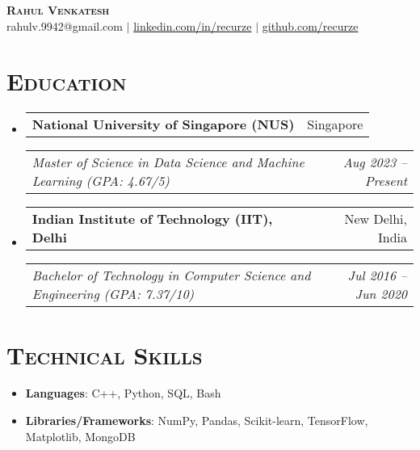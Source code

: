\documentclass[11pt]{article}
\makeatletter
\newcommand{\headerrow}[2]
{\begin{tabular*}{\linewidth}{l@{\extracolsep{\fill}}r}
    #1 &
    #2 \\
\end{tabular*}}
\makeatother
\begin{document}
\thispagestyle{empty}

\begin{center}
    {\huge \textsc{\textbf{Rahul Venkatesh}}} \\[2pt]
    rahulv.9942@gmail.com
    $\mid$
    \href{https://www.linkedin.com/in/recurze}{linkedin.com/in/recurze}
    $\mid$
    \href{https://github.com/recurze}{github.com/recurze}
\end{center}

\section*{\textsc{\textbf{Education}}}
\begin{itemize}[leftmargin=0em]

\item[]
    \headerrow {\textbf{National University of Singapore (NUS)}}{Singapore}
        \headerrow {\emph{Master of Science in Data Science and Machine Learning (GPA: 4.67/5)}}{\emph{Aug 2023 -- Present}}

\item[]
    \headerrow {\textbf{Indian Institute of Technology (IIT), Delhi}}{New Delhi, India}
        \headerrow {\emph{Bachelor of Technology in Computer Science and Engineering (GPA: 7.37/10)}}{\emph{Jul 2016 -- Jun 2020}}

\end{itemize}

\section*{\textsc{\textbf{Technical Skills}}}
\begin{itemize}[itemsep=0em, leftmargin=0.7em]
\item[]
    \textbf{Languages}: C++, Python, SQL, Bash
\item[]
    \textbf{Libraries/Frameworks}: NumPy, Pandas, Scikit-learn, TensorFlow, Matplotlib, MongoDB
\end{itemize}
\end{document}
